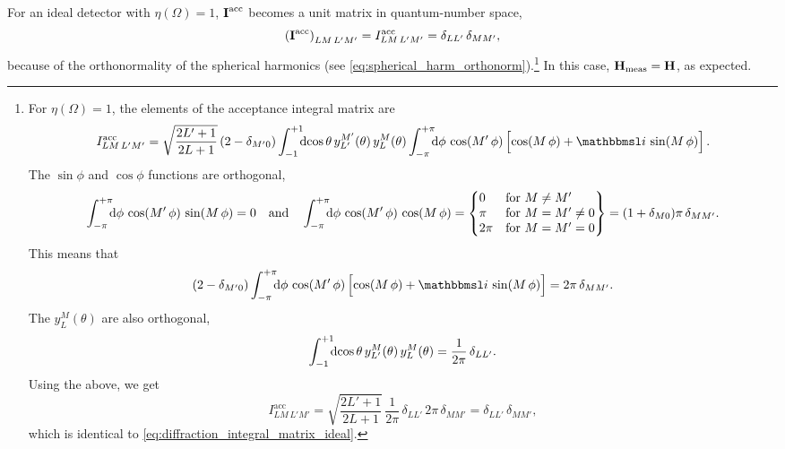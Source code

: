 For an ideal detector with $\eta(\Omega) = 1$, $\bm{\mathrm{I}}^\text{acc}$
becomes a unit matrix in quantum-number space, \ie
\begin{equation}
  \label{eq:diffraction_integral_matrix_ideal}
  \rBrk{\mat{I}^\text{acc}}_{L M\, L' M'}
  = I^\text{acc}_{L M\, L' M'}
  = \delta_{L L'}\, \delta_{M M'},
\end{equation}
because of the orthonormality of the spherical harmonics (see
\cref{eq:spherical_harm_orthonorm}).\footnote{%
  \label{fn:diffraction_integral_matrix_perfect_det}%
  For $\eta(\Omega) = 1$, the elements of the acceptance integral
  matrix are
  \begin{equation}
    I^\text{acc}_{L M\, L' M'}
    = \sqrt{\frac{2 L' + 1}{2 L + 1}}\, (2 - \delta_{M' 0})
    \int_{-1}^{+1}\!\!\! \dif{\cos\theta}\, y_{L'}^{M'}(\theta)\, y_L^M(\theta)
    \int_{-\pi}^{+\pi}\!\!\! \dif{\phi}\, \cos(M'\, \phi) \sBrk[2]{\cos(M\, \phi) + \imag\, \sin(M\, \phi)}.
  \end{equation}
  The $\sin \phi$ and $\cos \phi$ functions are orthogonal, \ie
  \begin{equation}
    \label{eq:sin_cos_orthogonality}
    \int_{-\pi}^{+\pi}\!\!\! \dif{\phi}\, \cos(M'\, \phi)\, \sin(M\, \phi)
    = 0
    \quad\text{and}\quad
    \int_{-\pi}^{+\pi}\!\!\! \dif{\phi}\, \cos(M'\, \phi)\, \cos(M\, \phi)
    = \begin{Bmatrix*}[l]
      0    & \text{for $M \neq M'$} \\
      \pi  & \text{for $M = M' \neq 0$} \\
      2\pi & \text{for $M = M' = 0$}
    \end{Bmatrix*}
    = (1 + \delta_{M 0}) \pi\, \delta_{M M'}.
  \end{equation}
  This means that
  \begin{equation}
    (2 - \delta_{M' 0})
    \int_{-\pi}^{+\pi}\!\!\! \dif{\phi}\, \cos(M'\, \phi) \sBrk[2]{\cos(M\, \phi) + \imag\, \sin(M\, \phi)}
    = 2 \pi\, \delta_{M M'}.
  \end{equation}
  The $y_L^M(\theta)$ are also orthogonal, \ie
  \begin{equation}
    \label{eq:small_y_orthogonality}
    \int_{-1}^{+1}\!\!\! \dif{\cos\theta}\, y_{L'}^{M}(\theta)\, y_L^M(\theta)
    = \frac{1}{2 \pi}\, \delta_{L L'}.
  \end{equation}
  Using the above, we get
  \begin{equation}
    I^\text{acc}_{L M\, L' M'}
    = \sqrt{\frac{2 L' + 1}{2 L + 1}}\,
    \frac{1}{2 \pi}\, \delta_{L L'}\,
    2 \pi\, \delta_{M M'}
    = \delta_{L L'}\, \delta_{M M'},
  \end{equation}
  which is identical to \cref{eq:diffraction_integral_matrix_ideal}.
}
In this case, $\bm{\mathrm{H}}_\text{meas} = \bm{\mathrm{H}}$, as expected.

